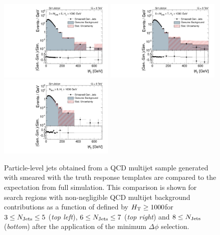 \begin{figure}[!t]
  \centering

  \begin{minipage}[c]{1.\textwidth}
    \begin{center}
      \includegraphics[width=0.49\textwidth]{figures/MHT_JetBin2_HThigh_madgraph_DR53X_chs_withoutPUReweighting_SmearedGenJets_v1.pdf}%
      \includegraphics[width=0.49\textwidth]{figures/MHT_JetBin3_HThigh_madgraph_DR53X_chs_withoutPUReweighting_SmearedGenJets_v1.pdf}\\ 
      \includegraphics[width=0.49\textwidth]{figures/MHT_JetBin4_HThigh_madgraph_DR53X_chs_withoutPUReweighting_SmearedGenJets_v1.pdf}
    \end{center}
  \end{minipage}
  \caption{Particle-level jets obtained from a QCD multijet sample generated with \madgraph smeared with the truth response templates are compared to the expectation from full simulation. This comparison is shown for search regions with non-negligible QCD multijet background contributions as a function of \MHT defined by $H_{\text{T}} \ge 1000$\gev for $3 \le N_{\text{Jets}} \le 5$ (\textit{top left}), $6 \le N_{\text{Jets}} \le 7$ (\textit{top right}) and $8 \le N_{\text{Jets}}$ (\textit{bottom}) after the application of the minimum $\Delta \phi$ selection.}
  \label{fig:qcd_rs_genjets}
\end{figure}
